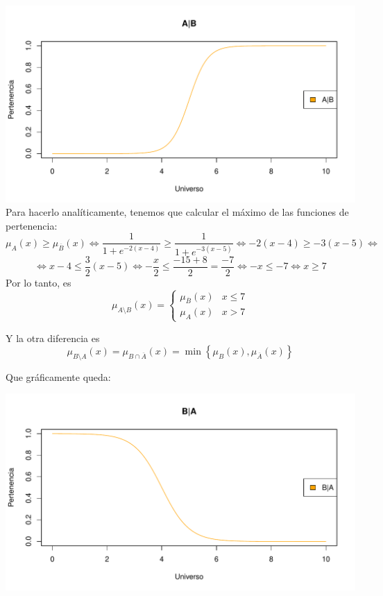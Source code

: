 \documentclass[
]{article}
\begin{document}
\includegraphics{tareaBloque3_files/figure-latex/unnamed-chunk-5-1.pdf}
Para hacerlo analíticamente, tenemos que calcular el máximo de las
funciones de pertenencia:
\[\mu_{A}\left(x\right)\geq\mu_{\overline{B}}\left(x\right)\iff\frac{1}{1+e^{-2\left(x-4\right)}}\geq\frac{1}{1+e^{-3\left(x-5\right)}}\iff-2\left(x-4\right)\geq-3\left(x-5\right)\iff\]
\[\iff x-4\leq\frac{3}{2}\left(x-5\right)\iff-\frac{x}{2}\leq\frac{-15+8}{2}=\frac{-7}{2}\iff-x\leq-7\iff x\geq7\]
Por lo tanto, es \[\mu_{A\setminus B}\left(x\right)=\begin{cases}
\mu_{\overline{B}}\left(x\right) & x\leq7\\
\mu_{A}\left(x\right) & x>7
\end{cases}\]

Y la otra diferencia es
\[\mu_{B\setminus A}\left(x\right)=\mu_{B\cap\overline{A}}\left(x\right)=\min\left\{ \mu_{B}\left(x\right),\mu_{\overline{A}}\left(x\right)\right\}\]

Que gráficamente queda:

\includegraphics{tareaBloque3_files/figure-latex/unnamed-chunk-6-1.pdf}
\end{document}
